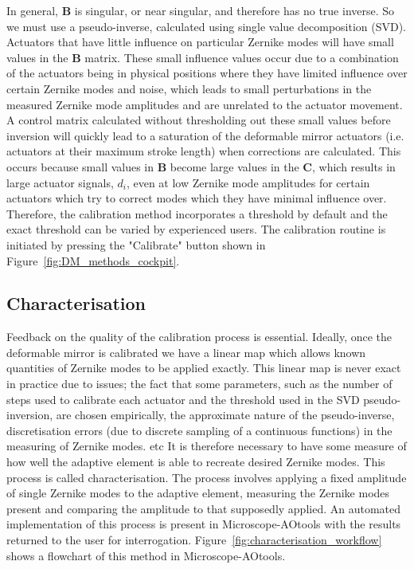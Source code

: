 In general, $\boldsymbol{B}$ is singular, or near singular, and therefore has 
no true inverse. So we must use a pseudo-inverse, calculated using single 
value decomposition (SVD). Actuators that have little influence on particular 
Zernike modes will have small values in the $\boldsymbol{B}$ matrix. These 
small influence values occur due to a combination of the actuators being in 
physical positions where they have limited influence over certain Zernike 
modes and noise, which leads to small perturbations in the measured Zernike 
mode amplitudes and are unrelated to the actuator movement. A control matrix 
calculated without thresholding out these small values before inversion will 
quickly lead to a saturation of the deformable mirror  actuators (i.e. 
actuators at their maximum stroke length) when corrections are 
calculated\cite{booth2005methods}. This occurs because small values in 
$\boldsymbol{B}$ become large values in the $\boldsymbol{C}$, which results 
in large actuator signals, $d_{i}$, even at low Zernike mode amplitudes for 
certain actuators which try to correct modes which they have minimal 
influence over. Therefore, the calibration method incorporates a threshold by 
default and the exact threshold can be varied by experienced users. The 
calibration routine is initiated by pressing the "Calibrate" button shown in 
Figure~\ref{fig:DM_methods_cockpit}.

\subsection{Characterisation}
\label{subsec:characterisation}

Feedback on the quality of the calibration process is essential. Ideally, once the deformable mirror is calibrated we have a linear map which allows known quantities of Zernike modes to be applied exactly. This linear map is never exact in practice due to issues; the fact that some parameters, such as the number of steps used to calibrate each actuator and the threshold used in the SVD pseudo-inversion, are chosen empirically, the approximate nature of the pseudo-inverse, discretisation errors (due to discrete sampling of a continuous functions) in the measuring of Zernike modes. etc It is therefore necessary to have some measure of how well the adaptive element is able to recreate desired Zernike modes. This process is called characterisation. The process involves applying a fixed amplitude of single Zernike modes to the adaptive element, measuring the Zernike modes present and comparing the amplitude to that supposedly applied. An automated implementation of this process is present in Microscope-AOtools with the results returned to the user for interrogation. Figure~\ref{fig:characterisation_workflow} shows a flowchart of this method in Microscope-AOtools. 

